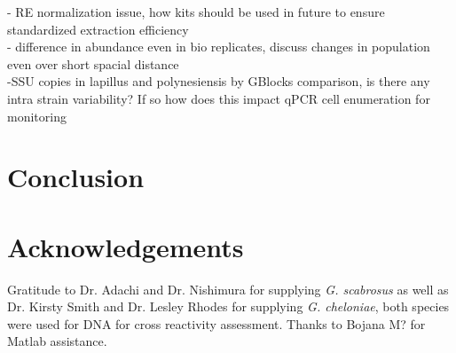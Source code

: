 \documentclass[12pt]{article}
\begin{document}
- RE normalization issue, how kits should be used in future to ensure standardized extraction efficiency\\
- difference in abundance even in bio replicates, discuss changes in population even over short spacial distance\\
-SSU copies in lapillus and polynesiensis by GBlocks comparison, is there any intra strain variability? If so how does this impact qPCR cell enumeration for monitoring\\
\newpage
\section{Conclusion}
\section{Acknowledgements}
Gratitude to Dr. Adachi and Dr. Nishimura for supplying \emph{G. scabrosus} as well as Dr. Kirsty Smith and Dr. Lesley Rhodes for supplying \emph{G. cheloniae}, both species were used for DNA for cross reactivity assessment. Thanks to Bojana M? for Matlab assistance.
\FloatBarrier
\newpage


\end{document}
